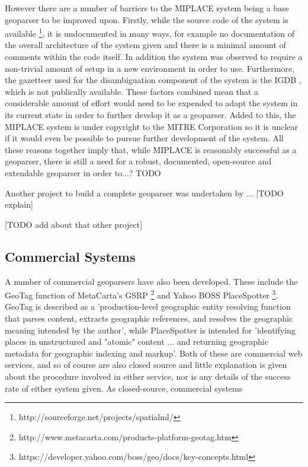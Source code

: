 \documentclass[12pt, a4paper]{report}
\begin{document}
However there are a number of barriers to the MIPLACE system being a base geoparser to be improved upon. Firstly, while the source code of the system is available \footnote{http://sourceforge.net/projects/spatialml/}, it is undocumented in many ways, for example no documentation of the overall architecture of the system given and there is a minimal amount of comments within the code itself. In addition the system was observed to require a non-trivial amount of setup in a new environment in order to use. Furthermore, the gazetteer used for the disambiguation component of the system is the IGDB \citep{igdb2005}, which is not publically available. These factors combined mean that a considerable amount of effort would need to be expended to adapt the system in its current state in order to further develop it as a geoparser. Added to this, the MIPLACE system is under copyright to the MITRE Corporation so it is unclear if it would even be possible to pursue further development of the system. All these reasons together imply that, while MIPLACE is reasonably successful as a geoparser, there is still a need for a robust, documented, open-source and extendable geoparser in order to...? TODO

Another project to build a complete geoparser was undertaken by \citet{tobin2010}... [TODO explain]

[TODO add about that other project]

\subsection{Commercial Systems}
\label{subsec:commercial_systems}

A number of commercial geoparsers have also been developed. These include the GeoTag function of MetaCarta's GSRP \footnote{http://www.metacarta.com/products-platform-geotag.htm} and Yahoo BOSS PlaceSpotter \footnote{https://developer.yahoo.com/boss/geo/docs/key-concepts.html}. GeoTag is described as a 'production-level geographic entity resolving function that parses content, extracts geographic references, and resolves the geographic meaning intended by the author', while PlaceSpotter is intended for 'identifying places in unstructured and "atomic" content ... and returning geographic metadata for geographic indexing and markup'. Both of these are commercial web services, and so of course are also closed source and little explanation is given about the procedure involved in either service, nor is any details of the success rate of either system given. As closed-source, commercial systems 
 
\end{document}
